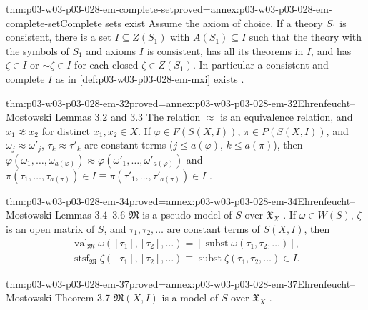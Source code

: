 \begin{hblemma}{thm:p03-w03-p03-028-em-complete-set}{proved=annex:p03-w03-p03-028-em-complete-set}{Complete sets exist}
Assume the axiom of choice.  If a theory \(S_1\) is consistent, there is a
set \(I\subseteq Z(S_1)\) with \(A(S_1)\subseteq I\) such that the theory with
the symbols of \(S_1\) and axioms \(I\) is consistent, has all its theorems in
\(I\), and has \(\zeta\in I\) or \(\mathord\sim\zeta\in I\) for each closed
\(\zeta\in Z(S_1)\).  In particular a consistent and complete \(I\) as in
\cref{def:p03-w03-p03-028-em-mxi} exists
\cite[p.~54]{EhrenfeuchtMostowski1956}.
\end{hblemma}

\begin{hblemma}{thm:p03-w03-p03-028-em-32}{proved=annex:p03-w03-p03-028-em-32}{Ehrenfeucht--Mostowski Lemmas 3.2 and 3.3}
The relation \(\approx\) is an equivalence relation, and
\(x_1\not\approx x_2\) for distinct \(x_1,x_2\in X\).  If
\(\varphi\in F(S(X,I))\), \(\pi\in P(S(X,I))\), and
\(\omega_j\approx\omega'_j\), \(\tau_k\approx\tau'_k\) are constant terms
(\(j\leq a(\varphi)\), \(k\leq a(\pi)\)), then
\(\varphi(\omega_1,\ldots,\omega_{a(\varphi)})\approx
\varphi(\omega'_1,\ldots,\omega'_{a(\varphi)})\) and
\(\pi(\tau_1,\ldots,\tau_{a(\pi)})\in I\equiv
\pi(\tau'_1,\ldots,\tau'_{a(\pi)})\in I\)
\cite[Lemmas~3.2--3.3, p.~54]{EhrenfeuchtMostowski1956}.
\end{hblemma}

\begin{hblemma}{thm:p03-w03-p03-028-em-34}{proved=annex:p03-w03-p03-028-em-34}{Ehrenfeucht--Mostowski Lemmas 3.4--3.6}
\(\mathfrak M\) is a pseudo-model of \(S\) over \(\mathfrak X_X\)
\cite[Lemma~3.4, p.~55]{EhrenfeuchtMostowski1956}.  If \(\omega\in W(S)\),
\(\zeta\) is an open matrix of \(S\), and \(\tau_1,\tau_2,\ldots\) are
constant terms of \(S(X,I)\), then
\cite[Lemmas~3.5--3.6, p.~55]{EhrenfeuchtMostowski1956}
\begin{gather*}
  \operatorname{val}_{\mathfrak M}\omega([\tau_1],[\tau_2],\ldots)
   =[\operatorname{subst}\omega(\tau_1,\tau_2,\ldots)],\\
  \operatorname{stsf}_{\mathfrak M}\zeta([\tau_1],[\tau_2],\ldots)
   \equiv\operatorname{subst}\zeta(\tau_1,\tau_2,\ldots)\in I .
\end{gather*}
\end{hblemma}

\begin{hbtheorem}{thm:p03-w03-p03-028-em-37}{proved=annex:p03-w03-p03-028-em-37}{Ehrenfeucht--Mostowski Theorem 3.7}
\(\mathfrak M(X,I)\) is a model of \(S\) over \(\mathfrak X_X\)
\cite[Theorem~3.7, p.~55]{EhrenfeuchtMostowski1956}.
\end{hbtheorem}

